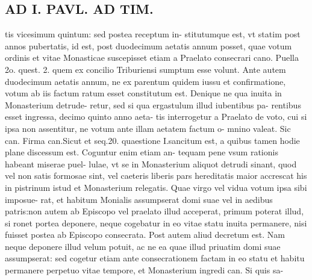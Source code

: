 \documentclass{article}
\begin{document}
\begin{pages}
\section*{AD I. PAVL. AD TIM. }
\marginpar{[ p.294 ]}\pstart tis vicesimum quintum: sed postea receptum in- stitutumque est, vt statim post annos pubertatis, id est, post duodecimum aetatis annum posset, quae votum ordinis et vitae Monasticae suscepisset etiam a Praelato consecrari cano. Puella 2o. quest. 2. quem ex concilio Triburiensi sumptum esse volunt. Ante autem duodecimum aetatis annum, ne ex parentum quidem iussu et confirmatione, votum ab iis factum ratum esset constitutum est. Denique ne qua inuita in Monasterium detrude- retur, sed si qua ergastulum illud iubentibus pa- rentibus esset ingressa, decimo quinto anno aeta- tis interrogetur a Praelato de voto, cui si ipsa non assentitur, ne votum ante illam aetatem factum o- mnino valeat. Sic can. Firma can.Sicut et seq.20. quaestione I.sancitum est, a quibus tamen hodie plane discessum est. Coguntur enim etiam an- tequam pene vsum rationis habeant miserae puel- lulae, vt se in Monasterium aliquot detrudi sinant, quod vel non satis formosae sint, vel caeteris liberis pars hereditatis maior accrescat his in pistrinum istud et Monasterium relegatis.  \pend\pstart Quae virgo vel vidua votum ipsa sibi imposue- rat, et habitum Monialis assumpserat domi suae vel in aedibus patris:non autem ab Episcopo vel praelato illud acceperat, primum poterat illud, si ronet portea deponere, neque cogebatur in eo vitae statu inuita permanere, nisi fuisset postea ab Episcopo consecrata. Post autem aliud decretum est. Nam neque deponere illud velum potuit, ac ne ea quae illud priuatim domi suae assumpserat: sed cogetur etiam ante consecrationem factam in eo statu et habitu permanere perpetuo vitae tempore, et Monasterium ingredi can. Si quis sa-  \pend

\end{pages}
\end{document}
